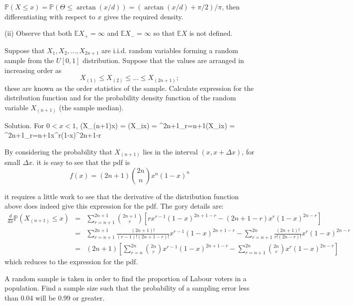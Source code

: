 $\mathbb{P}(X\leq x)=\mathbb{P}(\Theta\leq \arctan(x/d)) = \left(\arctan(x/d)+\pi/2\right)/\pi$, then differentiating with respect to $x$ gives the required density. 

(ii) Observe that both $\mathbb{E}X_+=\infty$ and $\mathbb{E}X_-=\infty$ so that $\mathbb{E}X$ is not defined.


\item Suppose that $X_1,X_2,\dots,X_{2n+1}$ are i.i.d. random variables forming a random sample from the $U[0,1]$ distribution. Suppose that the values are arranged in increasing order as 
\begin{equation}
X_{(1)}\leq X_{(2)}\leq\dots\leq X_{(2n+1)};
\end{equation}
these are known as the order statistics of the sample. Calculate expression for the distribution function and for the probability density function of the random variable $X_{(n+1)}$ (the sample median).



Solution. For $0<x<1$, 
\beast
{}\left(X_{(n+1)}\leq x\right) = \left(X_i\leq x\right) = \sum^{2n+1}_{r=n+1}\left(X_i\leq x\right) = \sum^{2n+1}_{r=n+1}x^r(1-x)^{2n+1-r}
\eeast

By considering the probability that $X_{(n+1)}$ lies in the interval $(x,x+\Delta x)$, for small $\Delta x$. it is easy to see that the pdf is 
\begin{equation}
f(x) = (2n+1)\binom{2n}{n}x^n(1-x)^n
\end{equation}

it requires a little work to see that the derivative of the distribution function above does indeed give this expression for the pdf. The gory details are:
\begin{eqnarray}
\frac{d}{dx}\mathbb{P}\left(X_{(n+1)}\leq x\right) & = & \sum^{2n+1}_{r=n+1}\binom{2n+1}{r}\left[rx^{r-1}(1-x)^{2n+1-r} - (2n+1-r)x^r(1-x)^{2n-r}\right]\nonumber\\
& = & \sum^{2n+1}_{r=n+1}\frac{(2n+1)!}{(r-1)!(2n+1-r)!} x^{r-1}(1-x)^{2n+1-r} - \sum^{2n}_{r=n+1}\frac{(2n+1)!}{r!(2n-r)!} x^r(1-x)^{2n-r} \nonumber\\
& = & (2n+1)\left[\sum^{2n}_{r=n}\binom{2n}{r} x^{r-1}(1-x)^{2n+1-r} - \sum^{2n}_{r=n+1}\binom{2n}{r} x^r(1-x)^{2n-r}\right] 
\end{eqnarray}
which reduces to the expression for the pdf.


\item A random sample is taken in order to find the proportion of Labour voters in a population. Find a sample size such that the probability of a sampling error less than 0.04 will be 0.99 or greater.



